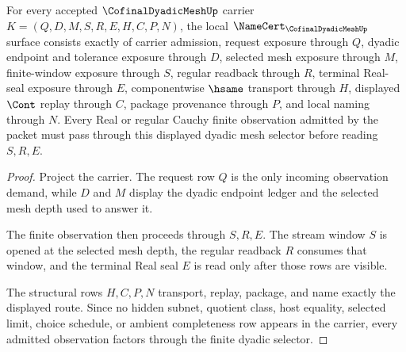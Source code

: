 \begin{theorem}
\label{thm:cofinal-dyadic-mesh-namecert-obligations}
For every accepted $\CofinalDyadicMeshUp$ carrier $K=(Q,D,M,S,R,E,H,C,P,N)$, the local $\NameCert_{\CofinalDyadicMeshUp}$ surface consists exactly of carrier admission, request exposure through $Q$, dyadic endpoint and tolerance exposure through $D$, selected mesh exposure through $M$, finite-window exposure through $S$, regular readback through $R$, terminal Real-seal exposure through $E$, componentwise $\hsame$ transport through $H$, displayed $\Cont$ replay through $C$, package provenance through $P$, and local naming through $N$. Every Real or regular Cauchy finite observation admitted by the packet must pass through this displayed dyadic mesh selector before reading $S,R,E$.
\end{theorem}
\begin{proof}
Project the carrier. The request row $Q$ is the only incoming observation demand, while $D$ and $M$ display the dyadic endpoint ledger and the selected mesh depth used to answer it.

The finite observation then proceeds through $S,R,E$. The stream window $S$ is opened at the selected mesh depth, the regular readback $R$ consumes that window, and the terminal Real seal $E$ is read only after those rows are visible.

The structural rows $H,C,P,N$ transport, replay, package, and name exactly the displayed route. Since no hidden subnet, quotient class, host equality, selected limit, choice schedule, or ambient completeness row appears in the carrier, every admitted observation factors through the finite dyadic selector.
\end{proof}




